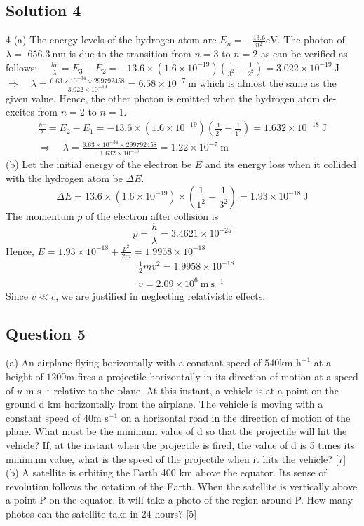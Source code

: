 \documentclass{article}
\begin{document}
\subsection{Solution 4}
4 (a) The energy levels of the hydrogen atom are $E_{n}=-\frac{13.6}{n^{2}} \mathrm{eV}$. The photon of $\lambda=$ $656.3 \mathrm{~nm}$ is due to the transition from $n=3$ to $n=2$ as can be verified as follows: $\quad \frac{h c}{\lambda}=E_{3}-E_{2}=-13.6 \times\left(1.6 \times 10^{-19}\right)\left(\frac{1}{3^{2}}-\frac{1}{2^{2}}\right)=3.022 \times 10^{-19} \mathrm{~J}$ $\Rightarrow \quad \lambda=\frac{6.63 \times 10^{-34} \times 299792458}{3.022 \times 10^{-19}}=6.58 \times 10^{-7} \mathrm{~m}$ which is almost the same as the given value.
Hence, the other photon is emitted when the hydrogen atom de-excites from $n=2$ to $n=1$.
$$
\begin{gathered}
	\frac{h c}{\lambda}=E_{2}-E_{1}=-13.6 \times\left(1.6 \times 10^{-19}\right)\left(\frac{1}{2^{2}}-\frac{1}{1^{2}}\right)=1.632 \times 10^{-18} \mathrm{~J} \\
	\Rightarrow \quad \lambda=\frac{6.63 \times 10^{-34} \times 299792458}{1.632 \times 10^{-18}}=1.22 \times 10^{-7} \mathrm{~m}
\end{gathered}
$$
(b) Let the initial energy of the electron be $E$ and its energy loss when it collided with the hydrogen atom be $\Delta E$.
$$
\Delta E=13.6 \times\left(1.6 \times 10^{-19}\right) \times\left(\frac{1}{1^{2}}-\frac{1}{3^{2}}\right)=1.93 \times 10^{-18} \mathrm{~J}
$$
The momentum $p$ of the electron after collision is 
$$
p = \frac{h}{\lambda} = 3.4621 \times 10^{-25} 
$$
Hence, $E=1.93 \times 10^{-18} + \frac{p^2}{2m} = 1.9958 \times 10^{-18}$
$$
\begin{aligned}
	&\frac{1}{2} m v^{2}= 1.9958 \times 10^{-18} \\
	&v=2.09 \times 10^{6} \mathrm{~m} \mathrm{~s}^{-1}
\end{aligned}
$$
Since $v \ll c$, we are justified in neglecting relativistic effects.


\subsection{Question 5}
(a) An airplane flying horizontally with a constant speed of $540 \text{km h}^{-1}$ at a height of $1200 \text{m}$ fires a projectile horizontally in its direction of motion at a speed of $u \text{ m s}^{-1}$ relative to the plane. At this instant, a vehicle is at a point on the ground d km horizontally from the airplane. The vehicle is moving with a constant speed of $40 \text{m s}^{-1}$ on a horizontal road in the direction of motion of the plane. What must be the minimum value of d so that the projectile will hit the vehicle? If, at the instant when the projectile is fired, the value of d is 5 times its minimum value, what is the speed of the projectile when it hits the vehicle? [7]\\
(b) A satellite is orbiting the Earth 400 km above the equator. Its sense of revolution follows the rotation of the Earth. When the satellite is vertically above a point P on the equator, it will take a photo of the region around P. How many photos can the satellite take in 24 hours? [5] 
\end{document}
